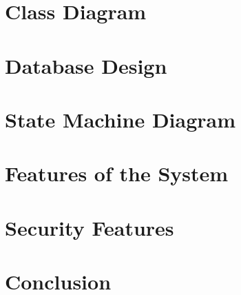 \documentclass[12pt,a4paper,oneside,draft]{article}
\begin{document}
\section{Class Diagram}

\section{Database Design}

\section{State Machine Diagram}

\section{Features of the System}

\section{Security Features}

\section{Conclusion}
\end{document}
